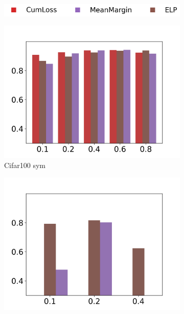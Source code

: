\documentclass{article}
\begin{document}
\begin{figure}[htbp]
    \centering
    \begin{subfigure}[b]{.8\textwidth}
        \includegraphics[width=\textwidth]{figs/F1legend_bar_noexternals.png}
    \vspace{-.5cm}
    \end{subfigure}
    \begin{subfigure}[b]{0.245\textwidth}
        \includegraphics[width=\textwidth]{figs/cifar100f1_noexternals_bars.png}
    \vspace{-.5cm}
        \caption{Cifar100 sym}
    \end{subfigure}
    \begin{subfigure}[b]{0.245\textwidth}
        \includegraphics[width=\textwidth]{figs/cifar100af1_noexternals_bars.png}

\end{subfigure}
\end{figure}
\end{document}
